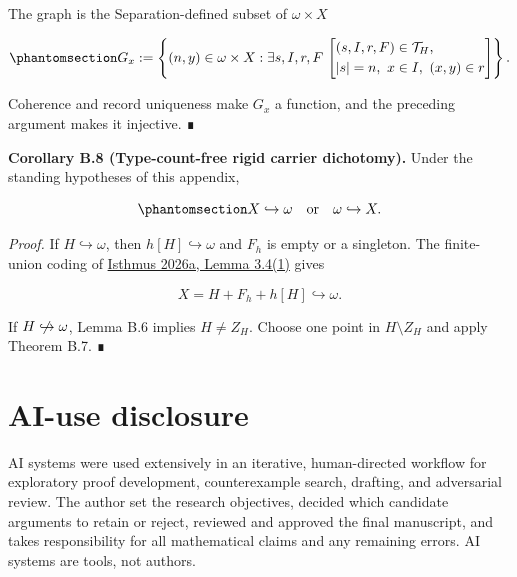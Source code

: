 \documentclass[
  english,
  11pt,
  reqno]{amsart}
\providecommand{\nhookrightarrow}{\centernot\hookrightarrow}
\begin{document}
The graph is the Separation-defined subset of \(\omega\times X\)

\begin{equation}\protect\phantomsection\label{eq:typefree-off-center-graph}{
G_x
:=
\left\{
(n,y)\in\omega\times X:
\exists s,I,r,F\,
\left[
\begin{aligned}
 &(s,I,r,F)\in\mathcal T_H,\\
 &|s|=n,\ x\in I,\ (x,y)\in r
\end{aligned}
\right]
\right\}.
}\end{equation}

Coherence and record uniqueness make \(G_x\) a function, and the
preceding argument makes it injective. ∎

\protect{}\label{cor:b-8-dyadic-dichotomy}

\textbf{Corollary B.8 (Type-count-free rigid carrier dichotomy).} Under
the standing hypotheses of this appendix,

\begin{equation}\protect\phantomsection\label{eq:typefree-rigid-dichotomy}{
X\hookrightarrow\omega
\quad\text{or}\quad
\omega\hookrightarrow X.
}\end{equation}

\emph{Proof.} If \(H\hookrightarrow\omega\), then
\(h[H]\hookrightarrow\omega\) and \(F_h\) is empty or a singleton. The
finite-union coding of \hyperref[ref:isthmus2026a]{Isthmus 2026a, Lemma
3.4(1)} gives

\[
X=H+F_h+h[H]\hookrightarrow\omega.
\]

If \(H\nhookrightarrow\omega\), Lemma B.6 implies \(H\ne Z_H\). Choose
one point in \(H\setminus Z_H\) and apply Theorem B.7. ∎

\protect{}\label{sec:ai-disclosure}

\section*{AI-use disclosure}\label{ai-use-disclosure}

AI systems were used extensively in an iterative, human-directed
workflow for exploratory proof development, counterexample search,
drafting, and adversarial review. The author set the research
objectives, decided which candidate arguments to retain or reject,
reviewed and approved the final manuscript, and takes responsibility for
all mathematical claims and any remaining errors. AI systems are tools,
not authors.

\protect{}\label{sec:references}
\end{document}
